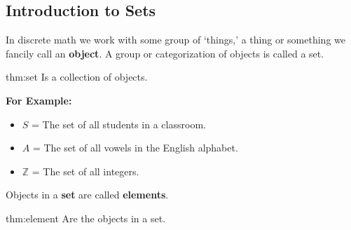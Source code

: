 \subsection{Introduction to Sets}
\hspace*{1em}
In discrete math we work with some group of `things,' a thing or something
we fancily call an \textbf{object}. A group or categorization of objects is called a set.

\begin{theo}[a Set]{thm:set}
    Is a collection of objects.
\end{theo}

\noindent
\textbf{For Example:}
\begin{itemize}
    \item $S$ = The set of all students in a classroom.
    \item $A$ = The set of all vowels in the English alphabet.
    \item $\mathbb{Z}$ = The set of all integers.

\end{itemize}
Objects in a \textbf{set} are called \textbf{elements}.

\begin{theo}[an Element]{thm:element}
    Are the objects in a set.
\end{theo}

\noindent
